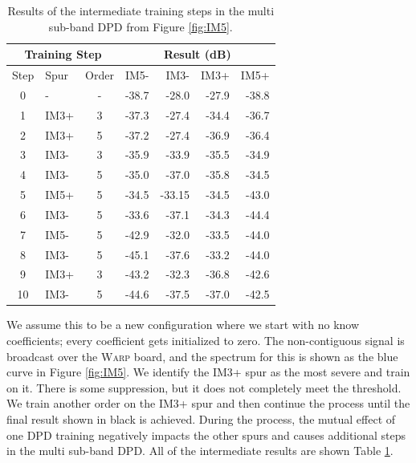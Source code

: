 \begin{table}
	\begin{tabular}{c l c|r r r r}
		
		\multicolumn{3}{c|}{Training Step}  & \multicolumn{4}{c}{Result (dB)} \\ 
		\hline 
		Step & Spur & Order & IM5-  & IM3- & IM3+ & IM5+ \\ 
		\hline 
		0 & - & - & -38.7 & -28.0 & -27.9 & -38.8 \\ 
		
		1 & IM3+ & 3 & -37.3 & -27.4 & -34.4 & -36.7 \\ 
		
		2 & IM3+ & 5 & -37.2 & -27.4 & -36.9 & -36.4 \\ 
		
		3 & IM3- & 3 & -35.9 & -33.9 & -35.5 & -34.9 \\ 
		
		4 & IM3- & 5 & -35.0 & -37.0 & -35.8 & -34.5 \\ 
		
		5 & IM5+ & 5 & -34.5 & -33.15 & -34.5 & -43.0 \\ 
		
		6 & IM3- & 5 & -33.6 & -37.1 & -34.3 & -44.4 \\ 
		
		7 & IM5- & 5 & -42.9 & -32.0 & -33.5 & -44.0 \\ 
		
		8 & IM3- & 5 & -45.1 & -37.6 & -33.2 & -44.0 \\ 
		
		9 & IM3+ & 3 & -43.2 & -32.3 & -36.8 & -42.6 \\ 
		
		10 & IM3- & 5 & -44.6 & -37.5 & -37.0 & -42.5 \\ 
		
	\end{tabular} 
	\caption{Results of the intermediate training steps in the multi sub-band DPD from Figure \ref{fig:IM5}.}
	\label{tab:IM5}
\end{table}

We assume this to be a new configuration where we start with no know coefficients; every coefficient gets initialized to zero. The non-contiguous signal is broadcast over the \textsc{Warp} board, and the spectrum for this is shown as the blue curve in Figure \ref{fig:IM5}. We identify the IM3+ spur as the most severe and train on it. There is some suppression, but it does not completely meet the threshold. We train another order on the IM3+ spur and then continue the process until the final result shown in black is achieved. During the process, the mutual effect of one DPD training negatively impacts the other spurs and causes additional steps in the multi sub-band DPD. All of the intermediate results are shown Table \ref{tab:IM5}.



